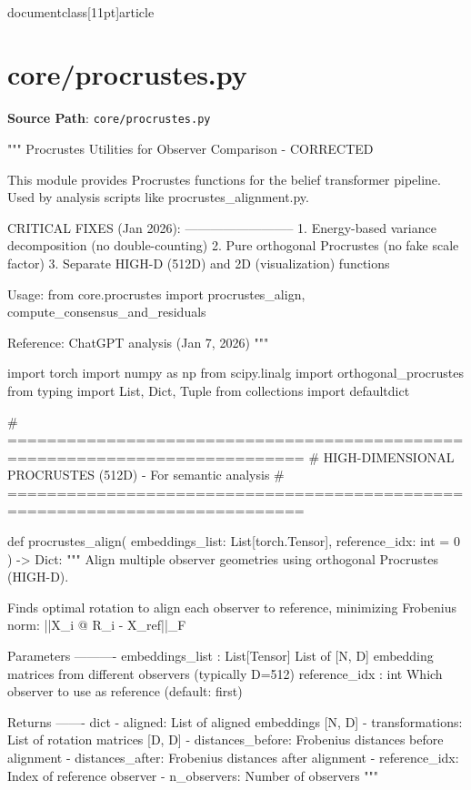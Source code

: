 \\documentclass[11pt]{article}
\begin{document}
\section*{core/procrustes.py}
\textbf{Source Path}: \texttt{core/procrustes.py}\par
\bigskip
\begin{CodeBlock}
"""
Procrustes Utilities for Observer Comparison - CORRECTED

This module provides Procrustes functions for the belief transformer pipeline.
Used by analysis scripts like procrustes_alignment.py.

CRITICAL FIXES (Jan 2026):
--------------------------
1. Energy-based variance decomposition (no double-counting)
2. Pure orthogonal Procrustes (no fake scale factor)
3. Separate HIGH-D (512D) and 2D (visualization) functions

Usage:
    from core.procrustes import procrustes_align, compute_consensus_and_residuals

Reference: ChatGPT analysis (Jan 7, 2026)
"""

import torch
import numpy as np
from scipy.linalg import orthogonal_procrustes
from typing import List, Dict, Tuple
from collections import defaultdict


# ============================================================================
# HIGH-DIMENSIONAL PROCRUSTES (512D) - For semantic analysis
# ============================================================================

def procrustes_align(
    embeddings_list: List[torch.Tensor],
    reference_idx: int = 0
) -> Dict:
    """
    Align multiple observer geometries using orthogonal Procrustes (HIGH-D).
    
    Finds optimal rotation to align each observer to reference,
    minimizing Frobenius norm: ||X_i @ R_i - X_ref||_F
    
    Parameters
    ----------
    embeddings_list : List[Tensor]
        List of [N, D] embedding matrices from different observers (typically D=512)
    reference_idx : int
        Which observer to use as reference (default: first)
    
    Returns
    -------
    dict
        - aligned: List of aligned embeddings [N, D]
        - transformations: List of rotation matrices [D, D]
        - distances_before: Frobenius distances before alignment
        - distances_after: Frobenius distances after alignment
        - reference_idx: Index of reference observer
        - n_observers: Number of observers
    """
    

\end{CodeBlock}
\end{document}
